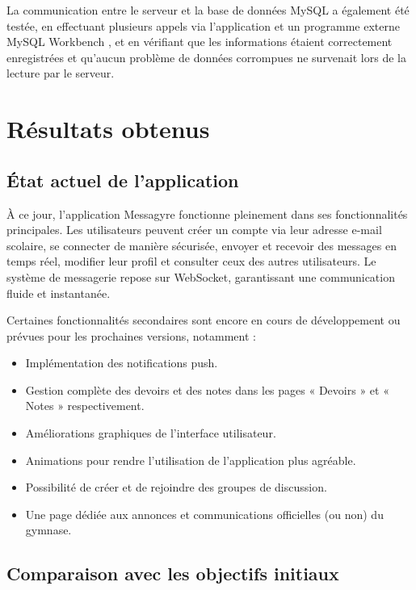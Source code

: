 \documentclass[12pt]{report}
\begin{document}
	La communication entre le serveur et la base de données MySQL \supercite{mysql} a également été testée, en effectuant plusieurs appels via l'application et un programme externe MySQL Workbench \supercite{mysqlworkbench}, et en vérifiant que les informations étaient correctement enregistrées et qu'aucun problème de données corrompues ne survenait lors de la lecture par le serveur.
	
	\chapter{Résultats obtenus}
	
	\section{État actuel de l'application}
	
	À ce jour, l'application Messagyre fonctionne pleinement dans ses fonctionnalités principales. Les utilisateurs peuvent créer un compte via leur adresse e-mail scolaire, se connecter de manière sécurisée, envoyer et recevoir des messages en temps réel, modifier leur profil et consulter ceux des autres utilisateurs. Le système de messagerie repose sur WebSocket, garantissant une communication fluide et instantanée.
	
	Certaines fonctionnalités secondaires sont encore en cours de développement ou prévues pour les prochaines versions, notamment :
	
	\begin{itemize}
		\item Implémentation des notifications push.
		\item Gestion complète des devoirs et des notes dans les pages « Devoirs » et « Notes » respectivement.
		\item Améliorations graphiques de l’interface utilisateur.
		\item Animations pour rendre l’utilisation de l’application plus agréable.
		\item Possibilité de créer et de rejoindre des groupes de discussion.
		\item Une page dédiée aux annonces et communications officielles (ou non) du gymnase.
	\end{itemize}
	
	\section{Comparaison avec les objectifs initiaux}
	
\end{document}

